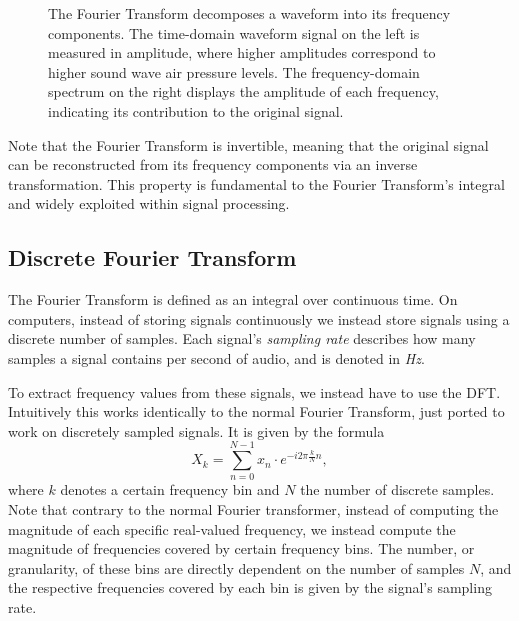 \begin{figure}[H]
    \centering
    \hspace*{-1.3cm}
    \caption{The Fourier Transform decomposes a waveform into its frequency components. The time-domain waveform signal on the left is measured in amplitude, where higher amplitudes correspond to higher sound wave air pressure levels. The frequency-domain spectrum on the right displays the amplitude of each frequency, indicating its contribution to the original signal.}
    \label{FTFigure}
\end{figure}

Note that the Fourier Transform is invertible, meaning that the original signal can be reconstructed from its frequency components via an inverse transformation. This property is fundamental to the Fourier Transform's integral and widely exploited within signal processing.

\subsection{Discrete Fourier Transform}

The Fourier Transform is defined as an integral over continuous time. On computers, instead of storing signals continuously we instead store signals using a discrete number of samples. Each signal's \textit{sampling rate} describes how many samples a signal contains per second of audio, and is denoted in \textit{Hz}.

To extract frequency values from these signals, we instead have to use the \gls{DFT}. Intuitively this works identically to the normal Fourier Transform, just ported to work on discretely sampled signals. It is given by the formula \[ X_k = \sum^{N - 1}_{n=0}{x_n \cdot e^{-i 2\pi \frac{k}{N} n}}, \] where $k$ denotes a certain frequency bin and $N$ the number of discrete samples. Note that contrary to the normal Fourier transformer, instead of computing the magnitude of each specific real-valued frequency, we instead compute the magnitude of frequencies covered by certain frequency bins. The number, or granularity, of these bins are directly dependent on the number of samples $N$, and the respective frequencies covered by each bin is given by the signal's sampling rate.

